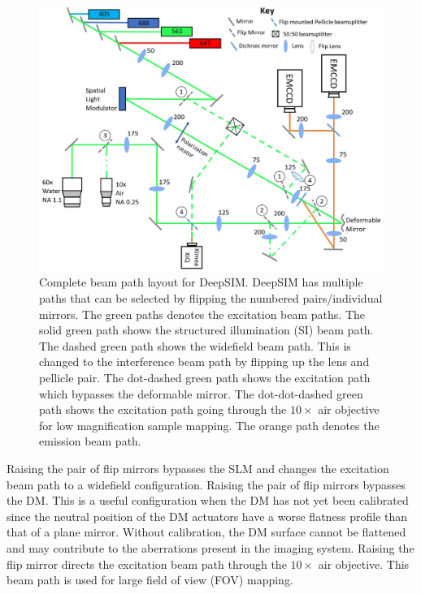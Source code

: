 \begin{figure}[h]
	\centering
	\includegraphics[width=\textwidth]{images/DeepSIM_complete_beam_paths.jpg}
	\caption[Complete beam path layout for DeepSIM.]{Complete beam path layout for DeepSIM. DeepSIM has multiple paths that can be selected by flipping the numbered pairs/individual mirrors. The green paths denotes the excitation beam paths. The solid green path shows the structured illumination (SI) beam path. The dashed green path shows the widefield beam path. This is changed to the interference beam path by flipping up the lens and pellicle pair. The dot-dashed green path shows the excitation path which bypasses the deformable mirror. The dot-dot-dashed green path shows the excitation path going through the $10\times$ air objective for low magnification sample mapping. The orange path denotes the emission beam path.}
	\label{fig:DeepSIM_complete_beam_paths}
\end{figure}

Raising the  pair of flip mirrors bypasses the SLM and changes the excitation beam path to a widefield configuration. Raising the  pair of flip mirrors bypasses the DM. This is a useful configuration when the DM has not yet been calibrated since the neutral position of the DM actuators have a worse flatness profile than that of a plane mirror. Without calibration, the DM surface cannot be flattened and may contribute to the aberrations present in the imaging system. Raising the  flip mirror directs the excitation beam path through the $10 \times$ air objective. This beam path is used for large field of view (FOV) mapping.

